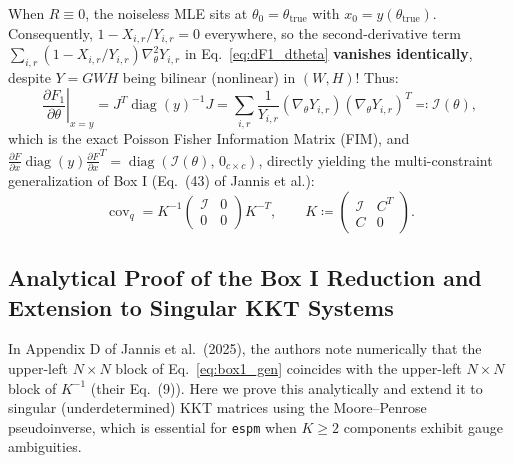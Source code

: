\documentclass[11pt,a4paper]{article}
\theoremstyle{plain}
\theoremstyle{definition}
\theoremstyle{remark}
\newcommand{\cI}{\mathcal{I}}
\newcommand{\diag}{\operatorname{diag}}
\newcommand{\cov}{\operatorname{cov}}
\begin{document}
\begin{tcolorbox}[colback=blue!3!white,colframe=blue!50!black,title={Key Simplification in the Unregularized Case ($R = 0$)}]
When $R \equiv 0$, the noiseless MLE sits at $\theta_0 = \theta_{\text{true}}$ with $x_0 = y(\theta_{\text{true}})$. Consequently, $1 - X_{i,r}/Y_{i,r} = 0$ everywhere, so the second-derivative term $\sum_{i,r} (1 - X_{i,r}/Y_{i,r}) \nabla^2_\theta Y_{i,r}$ in Eq.~\eqref{eq:dF1_dtheta} \textbf{vanishes identically}, despite $Y = GWH$ being bilinear (nonlinear) in $(W,H)$! Thus:
\begin{equation}
\left.\frac{\partial F_1}{\partial \theta}\right|_{x=y} = J^T \diag(y)^{-1} J = \sum_{i,r} \frac{1}{Y_{i,r}} (\nabla_\theta Y_{i,r})(\nabla_\theta Y_{i,r})^T \eqqcolon \cI(\theta),
\end{equation}
which is the exact Poisson Fisher Information Matrix (FIM), and $\frac{\partial F}{\partial x}\diag(y)\frac{\partial F}{\partial x}^T = \diag(\cI(\theta),\, 0_{c\times c})$, directly yielding the multi-constraint generalization of Box I (Eq.~(43) of Jannis et al.):
\begin{equation}
\label{eq:box1_gen}
\cov_q = K^{-1} \begin{pmatrix} \cI & 0 \\ 0 & 0 \end{pmatrix} K^{-T}, \qquad K \coloneqq \begin{pmatrix} \cI & C^T \\ C & 0 \end{pmatrix}.
\end{equation}
\end{tcolorbox}

\subsection{Analytical Proof of the Box I Reduction and Extension to Singular KKT Systems}
In Appendix D of Jannis et al.\ (2025), the authors note numerically that the upper-left $N\times N$ block of Eq.~\eqref{eq:box1_gen} coincides with the upper-left $N\times N$ block of $K^{-1}$ (their Eq.~(9)). Here we prove this analytically and extend it to singular (underdetermined) KKT matrices using the Moore--Penrose pseudoinverse, which is essential for \texttt{espm} when $K \ge 2$ components exhibit gauge ambiguities.
\end{document}
